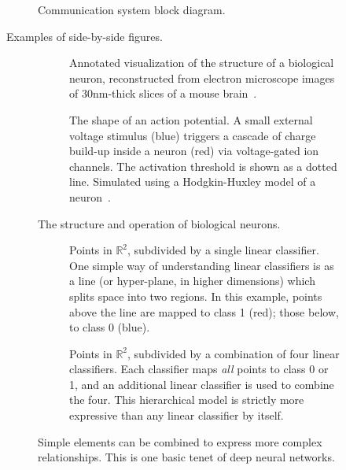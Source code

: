 \begin{figure}[hbt] %
\centering
  \figboxes
\caption{Communication system block diagram.}
\label{ch01.fig2} 
\end{figure}

Examples of side-by-side figures.

\begin{figure}[hbt]%
\centering
\begin{subfigure}[t]{0.45\textwidth}%
	\smfigboxes
\caption{Annotated visualization of the structure of a biological neuron, reconstructed from electron microscope images of 30nm-thick slices of a mouse 
brain~\cite{tesniere59}.}%
\label{fig:bioneuron}%
\end{subfigure}%
\qquad%
\begin{subfigure}[t]{0.45\textwidth}%
	\smfigboxes
\caption{The shape of an action potential. A small external voltage stimulus (blue) triggers a cascade of charge build-up inside a neuron (red) via voltage-gated ion channels. The activation threshold is shown as a dotted line. Simulated using a Hodgkin-Huxley model of a neuron~\protect\cite{weber-97}.}%
\label{fig:ap}%
\end{subfigure}%
\caption{The structure and operation of biological neurons.}%
\end{figure}

\begin{figure}[b]
\centering
\begin{subfigure}[t]{0.45\textwidth}
	\smfigboxes
\caption{Points in $\mathbb{R}^2$, subdivided by a single linear classifier. One simple way of understanding linear classifiers is as a line (or hyper-plane, in higher dimensions) which splits space into two regions. In this example, points above the line are mapped to class 1 (red); those below, to class 0 (blue).}
\label{subfig:linclass}
\end{subfigure}%
\qquad%
\begin{subfigure}[t]{0.45\textwidth}
	\smfigboxes
\caption{Points in $\mathbb{R}^2$, subdivided by a combination of four linear classifiers. Each classifier maps \emph{all} points to class 0 or 1, and an additional linear classifier is used to combine the four. This hierarchical model is strictly more expressive than any linear classifier by itself.}
\label{subfig:circclass}
\end{subfigure}%
\caption{Simple elements can be combined to express more complex relationships.
This is one basic tenet of deep neural networks.}
\label{fig:classifiers}
\end{figure}



